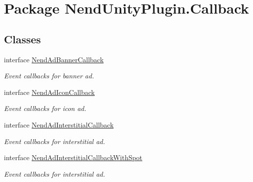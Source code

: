 \hypertarget{namespace_nend_unity_plugin_1_1_callback}{}\section{Package Nend\+Unity\+Plugin.\+Callback}
\label{namespace_nend_unity_plugin_1_1_callback}
\subsection*{Classes}
\begin{DoxyCompactItemize}
\item 
interface \hyperlink{interface_nend_unity_plugin_1_1_callback_1_1_nend_ad_banner_callback}{Nend\+Ad\+Banner\+Callback}
\begin{DoxyCompactList}\small\item\em Event callbacks for banner ad. \end{DoxyCompactList}\item 
interface \hyperlink{interface_nend_unity_plugin_1_1_callback_1_1_nend_ad_icon_callback}{Nend\+Ad\+Icon\+Callback}
\begin{DoxyCompactList}\small\item\em Event callbacks for icon ad. \end{DoxyCompactList}\item 
interface \hyperlink{interface_nend_unity_plugin_1_1_callback_1_1_nend_ad_interstitial_callback}{Nend\+Ad\+Interstitial\+Callback}
\begin{DoxyCompactList}\small\item\em Event callbacks for interstitial ad. \end{DoxyCompactList}\item 
interface \hyperlink{interface_nend_unity_plugin_1_1_callback_1_1_nend_ad_interstitial_callback_with_spot}{Nend\+Ad\+Interstitial\+Callback\+With\+Spot}
\begin{DoxyCompactList}\small\item\em Event callbacks for interstitial ad. \end{DoxyCompactList}\end{DoxyCompactItemize}
